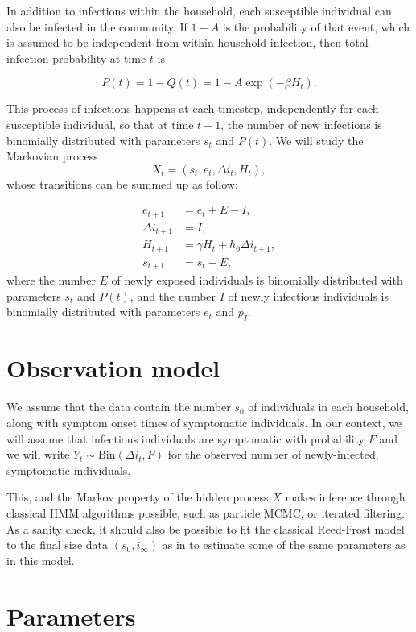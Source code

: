 \documentclass[a4paper]{article}
\begin{document}
In addition to infections within the household, each susceptible individual can
also be infected in the community. If \(1-A\) is the probability of that event,
which is assumed to be independent from within-household infection, then total
infection probability at time \(t\) is 

\[
	P(t)=1-Q(t) = 1-A\exp(-\beta H_t).
\]

This process of infections happens at each timestep, independently for each
susceptible individual, so that at time \(t+1\), the number of new infections is
binomially distributed with parameters \(s_t\) and \(P(t)\). We will study the
Markovian process
\begin{equation}
	X_t=(s_t,e_t,\Delta i_t,H_t),
\end{equation}
whose transitions can be summed up as follow:

\begin{align}
	e_{t+1} & = e_t + E - I, \\
	\Delta i_{t+1} & = I, \\
	H_{t+1} & = \gamma H_t + h_0 \Delta i_{t+1}, \\
	s_{t+1} & = s_t - E,
\end{align}
where the number \(E\) of newly exposed individuals is binomially distributed
with parameters \(s_t\) and \(P(t)\), and the number \(I\) of newly infectious
individuals is binomially distributed with parameters \(e_t\) and \(p_I\).

\section*{Observation model}

We assume that the data contain the number \(s_0\) of individuals in each
household, along with symptom onset times of symptomatic individuals. In our
context, we will assume that infectious individuals are symptomatic with
probability \(F\) and we will write \(Y_t \sim \text{Bin}(\Delta i_t,F)\) for 
the observed number of newly-infected, symptomatic individuals. 

This, and the Markov property of the hidden process \(X\) makes inference 
through classical HMM algorithms possible, such as particle MCMC, or iterated
filtering. As a sanity check, it should also be possible to fit the classical
Reed-Frost model to the final size data \((s_0,i_\infty)\) as in 
\cite{Cauchemez2014} to estimate some of the same parameters as in this model.

\section*{Parameters}
\end{document}
